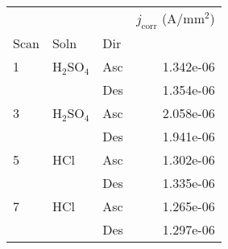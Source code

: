 \begin{tabular}{lllr}
\toprule
  &     &     &  $j_{\text{corr}}$ (A/mm$^2$) \\
Scan & Soln & Dir &                               \\
\midrule
1 & H$_2$SO$_4$ & Asc &                     1.342e-06 \\
  &     & Des &                     1.354e-06 \\
3 & H$_2$SO$_4$ & Asc &                     2.058e-06 \\
  &     & Des &                     1.941e-06 \\
5 & HCl & Asc &                     1.302e-06 \\
  &     & Des &                     1.335e-06 \\
7 & HCl & Asc &                     1.265e-06 \\
  &     & Des &                     1.297e-06 \\
\bottomrule
\end{tabular}
